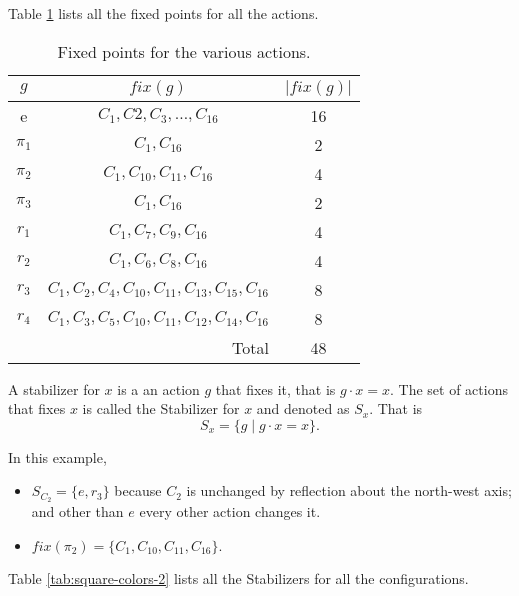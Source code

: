 \documentclass[11pt,twoside]{scrartcl}
\begin{document}
Table \ref{tab:square-colors-1} lists all the fixed points for all the actions.

\begin{table}[ht!]
    \centering
    \begin{tabular}{|c|c|c|}
        \hline
        $g$ & $fix(g)$ & $|fix(g)|$ \\
        \hline
        e & $C_1, C2, C_3, \ldots, C_{16}$ & 16 \\
        \hline
        $\pi_1$ & $C_1, C_{16}$ & 2 \\
        $\pi_2$ & $C_1, C_{10}, C_{11}, C_{16}$ & 4 \\
        $\pi_3$ & $C_1, C_{16}$ & 2 \\
        \hline
        $r_1$ & $C_1, C_7, C_9, C_{16}$& 4\\
        $r_2$ & $C_1, C_6, C_8, C_{16}$& 4\\
        $r_3$ & $C_1, C_2, C_4, C_{10}, C_{11}, C_{13}, C_{15}, C_{16}$& 8\\
        $r_4$ & $C_1, C_3, C_5, C_{10}, C_{11}, C_{12}, C_{14}, C_{16}$& 8\\
        \hline
        \multicolumn{2}{|r|}{Total}&48\\
        \hline

    \end{tabular}
    \caption{\label{tab:square-colors-1} Fixed points for the various actions.}
\end{table}
\begin{definition}[Stabilizer]
    A stabilizer for $x$ is a an action $g$ that fixes it, that is $g \cdot x = x$. The set of actions that fixes $x$ is called the Stabilizer for $x$ and denoted as $S_x$. That is
    \[S_x = \{g \mid g \cdot x = x\}. \]

\end{definition}

In this example,
\begin{itemize}
    \item $S_{C_2} = \{e, r_3\}$ because $C_2$ is unchanged by reflection about the north-west axis; and other than $e$ every other action changes it.
    \item $fix(\pi_2) = \{C_1, C_{10}, C_{11}, C_{16}\}$. 
\end{itemize}


Table \ref{tab:square-colors-2} lists all the Stabilizers for all the configurations.
\end{document}
